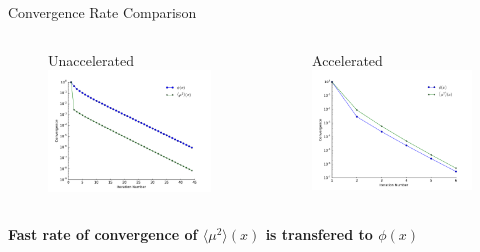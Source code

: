 \documentclass[10pt,draft]{beamer}
\newcommand{\edd}{\langle \mu^2 \rangle}
\begin{document}
\begin{frame}{Convergence Rate Comparison}

	\begin{columns}
	\begin{column}{.5\paperwidth}
	\begin{figure} \centering
		Unaccelerated
		\includegraphics[width=.45\paperwidth]{figs/converge_una.pdf}
	\end{figure}
	\end{column}
	\pause
	\begin{column}{.5\paperwidth}
	\begin{figure} \centering
		Accelerated
		\includegraphics[width=.45\paperwidth]{figs/converge_acc.pdf}
	\end{figure}
	\end{column}
	\end{columns}

	\pause
	\vfill
	\centerline{\textbf{Fast rate of convergence of $\edd(x)$ is transfered to $\phi(x)$}}

\end{frame}
\end{document}
